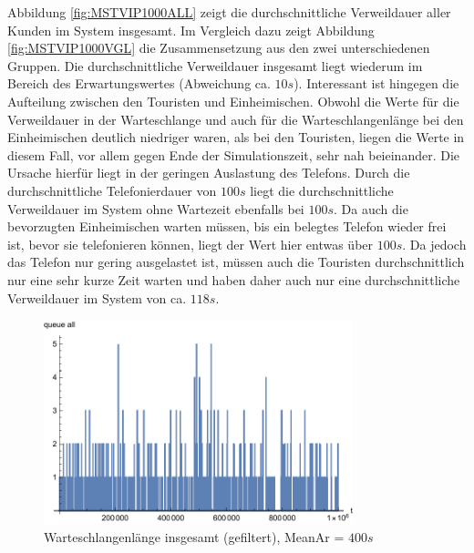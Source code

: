 Abbildung \ref{fig:MSTVIP1000ALL} zeigt die durchschnittliche Verweildauer aller Kunden im System insgesamt. Im Vergleich dazu zeigt Abbildung \ref{fig:MSTVIP1000VGL} die Zusammensetzung aus den zwei unterschiedenen Gruppen. Die durchschnittliche Verweildauer insgesamt liegt wiederum im Bereich des Erwartungswertes (Abweichung ca. $10s$). Interessant ist hingegen die Aufteilung zwischen den Touristen und Einheimischen. Obwohl die Werte für die Verweildauer in der Warteschlange und auch für die Warteschlangenlänge bei den Einheimischen deutlich niedriger waren, als bei den Touristen, liegen die Werte in diesem Fall, vor allem gegen Ende der Simulationszeit, sehr nah beieinander. Die Ursache hierfür liegt in der geringen Auslastung des Telefons. Durch die durchschnittliche Telefonierdauer von $100s$ liegt die durchschnittliche Verweildauer im System ohne Wartezeit ebenfalls bei $100s$. Da auch die bevorzugten Einheimischen warten müssen, bis ein belegtes Telefon wieder frei ist, bevor sie telefonieren können, liegt der Wert hier entwas über $100s$. Da jedoch das Telefon nur gering ausgelastet ist, müssen auch die Touristen durchschnittlich nur eine sehr kurze Zeit warten und haben daher auch nur eine durchschnittliche Verweildauer im System von ca. $118s$.

\begin{figure}[htpb]
	\centering
	\includegraphics[width=0.8\textwidth]{abbildungen/1_Phone_VIP/Arrival_400_Serve_100_dur_1000000_Skip_0/QueueStepPlotAllFiltered.pdf}
	\caption{Warteschlangenlänge insgesamt (gefiltert), MeanAr = $400s$}
	\label{fig:QSPALL400}
\end{figure}

